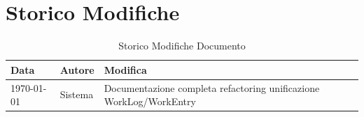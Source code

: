 \documentclass[11pt,a4paper]{article}
\begin{document}
\section{Storico Modifiche}

\begin{table}[h]
\centering
\begin{tabular}{llp{8cm}}
\toprule
\textbf{Data} & \textbf{Autore} & \textbf{Modifica} \\
\midrule
\today & Sistema & Documentazione completa refactoring unificazione WorkLog/WorkEntry \\
\bottomrule
\end{tabular}
\caption{Storico Modifiche Documento}
\end{table}
\end{document}
